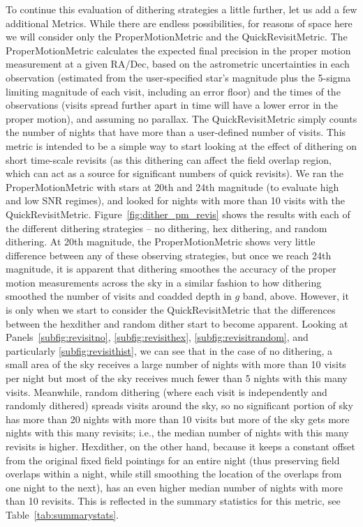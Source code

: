 \documentclass[]{spie}  %
\begin{document}
To continue this evaluation of dithering strategies a little further,
let us add a few additional Metrics. While there are endless
possibilities, for reasons of space here we will consider only the
ProperMotionMetric and the QuickRevisitMetric. The ProperMotionMetric
calculates the expected final precision in the proper motion measurement at a
given RA/Dec, based on the astrometric uncertainties in each observation
(estimated from the user-specified star's magnitude plus the 5-sigma
limiting magnitude of each visit, including an error floor) and the
times of the observations (visits spread further apart in time will
have a lower error in the proper motion), and assuming no parallax.  The
QuickRevisitMetric simply counts the number of nights that have more
than a user-defined number of visits. %
This metric is intended to be a
simple way to start looking at the effect of dithering on short
time-scale revisits (as this dithering can affect the field overlap
region, which can act as a source for significant numbers of quick
revisits). We ran the ProperMotionMetric with stars at 20th and 24th
magnitude (to evaluate high and low SNR regimes), and looked for
nights with more than 10 visits with the
QuickRevisitMetric. Figure~\ref{fig:dither_pm_revis} shows the results
with each of the different dithering strategies -- no dithering, hex
dithering, and random dithering. At 20th magnitude, the
ProperMotionMetric shows very little difference between any of these
observing strategies, but once we reach 24th magnitude, it is apparent
that dithering smoothes the accuracy of the proper motion
measurements across the sky in a similar fashion to how dithering smoothed the
number of visits and coadded depth in $g$ band, above. However, it is
only when we start to consider the QuickRevisitMetric that the
differences between the hexdither and random dither start to become
apparent. Looking at Panels~\ref{subfig:revisitno},
\ref{subfig:revisithex}, \ref{subfig:revisitrandom}, and particularly
\ref{subfig:revisithist}, we can see that in the case of no dithering,
a small area of the sky receives a large number of nights with more
than 10 visits per night but most of the sky receives much fewer than 5
nights with this many visits. Meanwhile, random dithering (where
each visit is independently and randomly dithered) spreads visits
around the sky, so no significant portion of sky has more than 20
nights with more than 10 visits but more of the sky gets more nights
with this many revisits; i.e., the median number of nights with
this many revisits is higher. Hexdither, on the other hand, because it
keeps a constant offset from the original fixed field pointings for an
entire night (thus preserving field overlaps within a night, while
still smoothing the location of the overlaps from one night to the
next), has an even higher median number of nights with more than 10
revisits. This is reflected in the summary statistics for this metric,
see Table~\ref{tab:summarystats}. 
\end{document}
